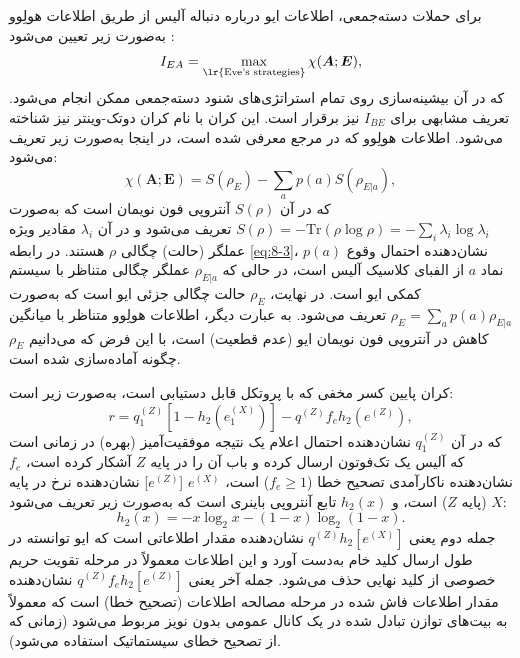 برای حملات دسته‌جمعی، اطلاعات ایو درباره دنباله آلیس از طریق اطلاعات هولِوو به‌صورت زیر تعیین می‌شود \cite{8-7, 8-8}:
\begin{equation}
	I_{EA} = \max_{\text{\lr{Eve's strategies}}} \chi(\bm{A}; \bm{E}),
	\label{eq:8-2}
\end{equation}
که در آن بیشینه‌سازی روی تمام استراتژی‌های شنود دسته‌جمعی ممکن انجام می‌شود. تعریف مشابهی برای $I_{BE}$ نیز برقرار است. این کران با نام کران دوتک-وینتر نیز شناخته می‌شود. اطلاعات هولِوو که در مرجع \cite{8-9} معرفی شده است، در اینجا به‌صورت زیر تعریف می‌شود:
\begin{equation}
	\chi(\bm{A}; \bm{E}) = S(\rho_E) - \sum_{a} p(a) S(\rho_{E|a}),
	\label{eq:8-3}
\end{equation}
که در آن $S(\rho)$ آنتروپی فون نویمان است که به‌صورت $S(\rho) = -\text{Tr}(\rho \log \rho) = -\sum_i \lambda_i \log \lambda_i$ تعریف می‌شود و در آن $\lambda_i$ مقادیر ویژه عملگر (حالت) چگالی $\rho$ هستند. در رابطه \eqref{eq:8-3}، $p(a)$ نشان‌دهنده احتمال وقوع نماد $a$ از الفبای کلاسیک آلیس است، در حالی که $\rho_{E|a}$ عملگر چگالی متناظر با سیستم کمکی ایو است. در نهایت، $\rho_E$ حالت چگالی جزئی ایو است که به‌صورت $\rho_E = \sum_a p(a) \rho_{E|a}$ تعریف می‌شود. به عبارت دیگر، اطلاعات هولِوو متناظر با میانگین کاهش در آنتروپی فون نویمان ایو (عدم قطعیت) است، با این فرض که می‌دانیم $\rho_E$ چگونه آماده‌سازی شده است.

کران پایین کسر مخفی که با پروتکل  قابل دستیابی است، به‌صورت زیر است:
\begin{equation}
	r = q_1^{(Z)} [1 - h_2(e_1^{(X)})] - q^{(Z)} f_e h_2(e^{(Z)}),
	\label{eq:8-4}
\end{equation}
که در آن $q_1^{(Z)}$ نشان‌دهنده احتمال اعلام یک نتیجه موفقیت‌آمیز (بهره) در زمانی است که آلیس یک تک‌فوتون ارسال کرده و باب آن را در پایه $Z$ آشکار کرده است، $f_e$ نشان‌دهنده ناکارآمدی تصحیح خطا ($f_e \geq 1$) است، $e^{(X)}$ [$e^{(Z)}$] نشان‌دهنده نرخ  در پایه $X$ (پایه $Z$) است، و $h_2(x)$ تابع آنتروپی باینری است که به‌صورت زیر تعریف می‌شود:
\begin{equation}
	h_2(x) = -x \log_2 x - (1-x) \log_2 (1-x).
	\label{eq:8-5}
\end{equation}
جمله دوم یعنی $q^{(Z)} h_2[e^{(X)}]$ نشان‌دهنده مقدار اطلاعاتی است که ایو توانسته در طول ارسال کلید خام به‌دست آورد و این اطلاعات معمولاً در مرحله تقویت حریم خصوصی از کلید نهایی حذف می‌شود. جمله آخر یعنی $q^{(Z)} f_e h_2[e^{(Z)}]$ نشان‌دهنده مقدار اطلاعات فاش شده در مرحله مصالحه اطلاعات (تصحیح خطا) است که معمولاً به بیت‌های توازن تبادل شده در یک کانال عمومی بدون نویز مربوط می‌شود (زمانی که از تصحیح خطای سیستماتیک استفاده می‌شود).






